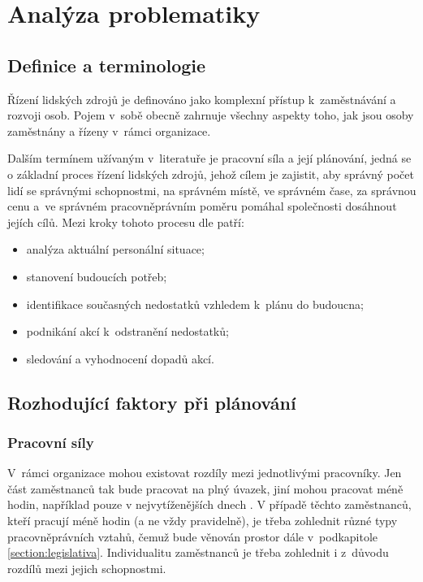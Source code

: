 \documentclass[twoside]{ctuthesis}
\begin{document}
\chapter{Analýza problematiky}

\section{Definice a terminologie}

Řízení lidských zdrojů je definováno jako komplexní přístup k~zaměstnávání a rozvoji osob. Pojem v~sobě obecně zahrnuje všechny aspekty toho, jak jsou osoby zaměstnány a řízeny v~rámci organizace. \cite[s.~1]{armstrong2014}

Dalším termínem užívaným v~literatuře je pracovní síla a její plánování, jedná se o základní proces řízení lidských zdrojů, jehož cílem je zajistit, aby správný počet lidí se správnými schopnostmi, na správném místě, ve správném čase, za správnou cenu a~ve správném pracovněprávním poměru pomáhal společnosti dosáhnout jejích cílů. Mezi kroky tohoto procesu dle \cite{cipd2020workforce} patří:
\begin{itemize}
	\item analýza aktuální personální situace;
	\item stanovení budoucích potřeb;
	\item identifikace současných nedostatků vzhledem k~plánu do budoucna;
	\item podnikání akcí k~odstranění nedostatků;
	\item sledování a vyhodnocení dopadů akcí.
\end{itemize}

\section{Rozhodující faktory při plánování}

\subsection{Pracovní síly}
V~rámci organizace mohou existovat rozdíly mezi jednotlivými pracovníky. Jen část zaměstnanců tak bude pracovat na plný úvazek, jiní mohou pracovat méně hodin, například pouze v nejvytíženějších dnech \cite{lin2015}. V případě těchto zaměstnanců, kteří pracují méně hodin (a ne vždy pravidelně), je třeba zohlednit různé typy pracovněprávních vztahů, čemuž bude věnován prostor dále v~podkapitole \ref{section:legislativa}. Individualitu zaměstnanců je třeba zohlednit i z~důvodu rozdílů mezi jejich schopnostmi.
\end{document}
